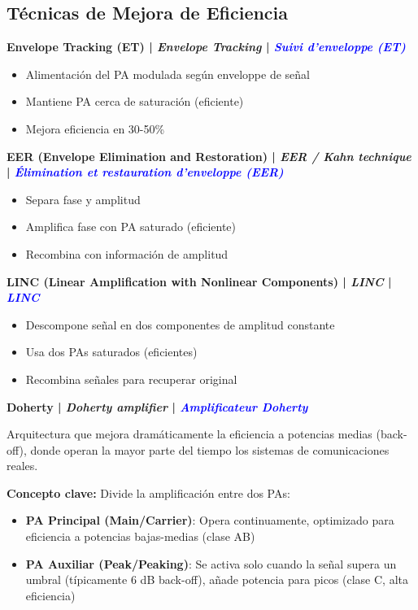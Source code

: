 \documentclass[a4paper,10pt]{article}
\begin{document}
\subsection{T\'ecnicas de Mejora de Eficiencia}

\textbf{Envelope Tracking (ET) | \textit{Envelope Tracking} | \textcolor{blue}{\textit{Suivi d'enveloppe (ET)}}}
\begin{itemize}[leftmargin=*]
    \item Alimentaci\'on del PA modulada seg\'un enveloppe de se\~nal
    \item Mantiene PA cerca de saturación (eficiente)
    \item Mejora eficiencia en 30-50\%
\end{itemize}

\textbf{EER (Envelope Elimination and Restoration) | \textit{EER / Kahn technique} | \textcolor{blue}{\textit{\'Elimination et restauration d'enveloppe (EER)}}}
\begin{itemize}[leftmargin=*]
    \item Separa fase y amplitud
    \item Amplifica fase con PA saturado (eficiente)
    \item Recombina con informaci\'on de amplitud
\end{itemize}

\textbf{LINC (Linear Amplification with Nonlinear Components) | \textit{LINC} | \textcolor{blue}{\textit{LINC}}}
\begin{itemize}[leftmargin=*]
    \item Descompone se\~nal en dos componentes de amplitud constante
    \item Usa dos PAs saturados (eficientes)
    \item Recombina se\~nales para recuperar original
\end{itemize}

\textbf{Doherty | \textit{Doherty amplifier} | \textcolor{blue}{\textit{Amplificateur Doherty}}}

Arquitectura que mejora dram\'aticamente la eficiencia a potencias medias (back-off), donde operan la mayor parte del tiempo los sistemas de comunicaciones reales.

\textbf{Concepto clave:} Divide la amplificaci\'on entre dos PAs:
\begin{itemize}[leftmargin=*]
    \item \textbf{PA Principal (Main/Carrier)}: Opera continuamente, optimizado para eficiencia a potencias bajas-medias (clase AB)
    \item \textbf{PA Auxiliar (Peak/Peaking)}: Se activa solo cuando la se\~nal supera un umbral (t\'ipicamente 6 dB back-off), a\~nade potencia para picos (clase C, alta eficiencia)
\end{itemize}
\end{document}
